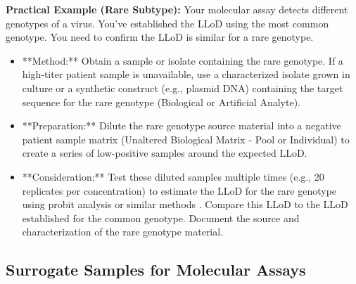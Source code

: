 \documentclass{article}
\begin{document}
\textbf{Practical Example (Rare Subtype):}
Your molecular assay detects different genotypes of a virus. You've established the LLoD using the most common genotype. You need to confirm the LLoD is similar for a rare genotype.
\begin{itemize}
    \item **Method:** Obtain a sample or isolate containing the rare genotype. If a high-titer patient sample is unavailable, use a characterized isolate grown in culture or a synthetic construct (e.g., plasmid DNA) containing the target sequence for the rare genotype (Biological or Artificial Analyte).
    \item **Preparation:** Dilute the rare genotype source material into a negative patient sample matrix (Unaltered Biological Matrix - Pool or Individual) to create a series of low-positive samples around the expected LLoD.
    \item **Consideration:** Test these diluted samples multiple times (e.g., 20 replicates per concentration) to estimate the LLoD for the rare genotype using probit analysis or similar methods \cite{CLSIEP17}. Compare this LLoD to the LLoD established for the common genotype. Document the source and characterization of the rare genotype material.
\end{itemize}

\subsection{Surrogate Samples for Molecular Assays}
\end{document}
